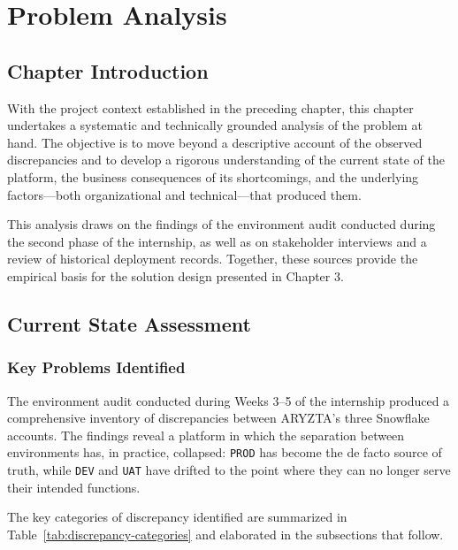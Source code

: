 \chapter{Problem Analysis}
\label{chap:analysis}

\section*{Chapter Introduction}

With the project context established in the preceding chapter, this chapter undertakes a systematic and technically grounded analysis of the problem at hand. The objective is to move beyond a descriptive account of the observed discrepancies and to develop a rigorous understanding of the current state of the platform, the business consequences of its shortcomings, and the underlying factors---both organizational and technical---that produced them.

This analysis draws on the findings of the environment audit conducted during the second phase of the internship, as well as on stakeholder interviews and a review of historical deployment records. Together, these sources provide the empirical basis for the solution design presented in Chapter 3.

\section{Current State Assessment}
\label{sec:current-state}

\subsection{Key Problems Identified}
\label{subsec:key-problems}

The environment audit conducted during Weeks 3--5 of the internship produced a comprehensive inventory of discrepancies between ARYZTA's three Snowflake accounts. The findings reveal a platform in which the separation between environments has, in practice, collapsed: \texttt{PROD} has become the de facto source of truth, while \texttt{DEV} and \texttt{UAT} have drifted to the point where they can no longer serve their intended functions.

The key categories of discrepancy identified are summarized in Table~\ref{tab:discrepancy-categories} and elaborated in the subsections that follow.

